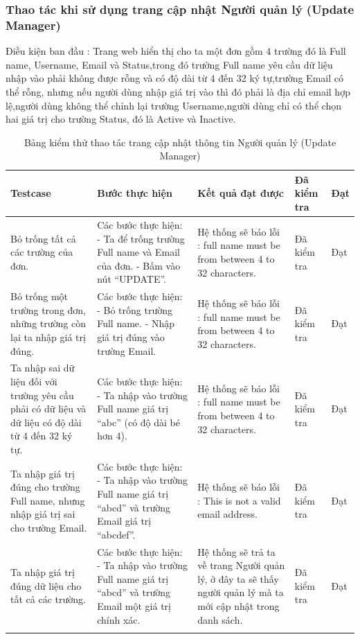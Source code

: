 \documentclass[a4paper]{article}
\begin{document}
\subsubsection*{Thao tác khi sử dụng trang cập nhật Người quản lý (Update Manager) }
Điều kiện ban đầu : Trang web hiển thị cho ta một đơn gồm 4 trường đó là Full name, Username, Email và Status,trong đó trường Full name yêu cầu dữ liệu nhập vào phải không được rỗng và có độ dài từ 4 đến 32 ký tự,trường Email có thể rỗng, nhưng nếu người dùng nhập giá trị vào thì đó phải là địa chỉ email hợp lệ,người dùng không thể chỉnh lại trường Username,người dùng chỉ có thể chọn hai giá trị cho trường Status, đó là Active và Inactive. \newline
\begin{longtable}{ | p{} |p{} | p{}  | p{}  | p{}  | } 
\hline
\textbf{Testcase}& \textbf{Bước thực hiện}& \textbf{Kết quả đạt được} & \textbf{Đã kiểm tra}& \textbf{Đạt} \\ 
\hline
\hline
Bỏ trống tất cả các trường của đơn. &
Các bước thực hiện: \newline
- Ta để trống trường Full name và Email của đơn. \newline
- Bấm vào nút “UPDATE”.
&
Hệ thống sẽ báo lỗi : full name must be from between 4 to 32 characters.
&
Đã kiểm tra &
Đạt \\

\hline
Bỏ trống một trường trong đơn, những trường còn lại ta nhập giá trị đúng. &
Các bước thực hiện: \newline
- Bỏ trống trường Full name.  \newline
- Nhập giá trị đúng vào trường Email. 
&
Hệ thống sẽ báo lỗi : full name must be from between 4 to 32 characters.
&
Đã kiểm tra &
Đạt \\

\hline
Ta nhập sai dữ liệu đối với trường yêu cầu phải có dữ liệu và dữ liệu có độ dài từ 4 đến 32 ký tự. &
Các bước thực hiện: \newline
- Ta nhập vào trường Full name giá trị “abc” (có độ dài bé hơn 4). 
&
Hệ thống sẽ báo lỗi : full name must be from between 4 to 32 characters.
&
Đã kiểm tra &
Đạt \\

\hline
Ta nhập giá trị đúng cho trường Full name, nhưng nhập giá trị sai cho trường Email. &
Các bước thực hiện: \newline
- Ta nhập vào trường Full name giá trị “abcd” và trường Email giá trị “abcdef”. 
&
Hệ thống sẽ báo lỗi : This is not a valid email address.
&
Đã kiểm tra &
Đạt \\

\hline
Ta nhập giá trị đúng dữ liệu cho tất cả các trường. &
Các bước thực hiện: \newline
- Ta nhập vào trường Full name giá trị “abcd” và trường Email một giá trị chính xác. 
&
Hệ thống sẽ trả ta về trang Người quản lý, ở đây ta sẽ thấy người quản lý mà ta mới cập nhật trong danh sách.
&
Đã kiểm tra &
Đạt \\

\hline
\caption{Bảng kiểm thử thao tác trang cập nhật thông tin Người quản lý (Update Manager)}
\end{longtable}
\end{document}
